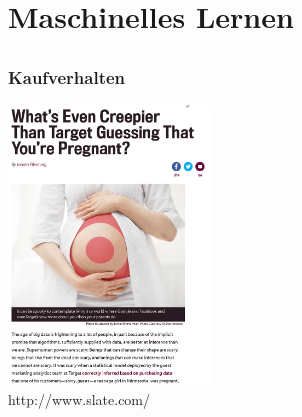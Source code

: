 \documentclass[12pt]{beamer}
\begin{document}
\section{Maschinelles Lernen}
\subsection{}

\begin{frame}
  \frametitle{Kaufverhalten}
  \pause
  \begin{center}
    \includegraphics[width=0.4\textwidth]{img/pregnant.png} \\
    \tiny http://www.slate.com/
  \end{center}
\end{frame}
\end{document}
